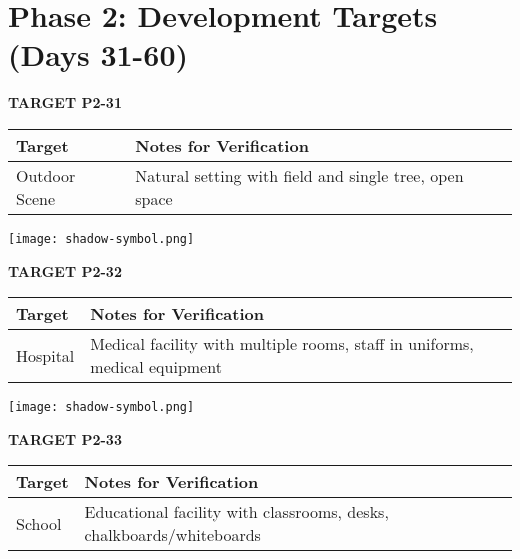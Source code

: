 \documentclass[10pt,twoside,final]{book} %
\makeatletter
\newcommand{\cleardoublepageWithSymbol}{%
  \clearpage %
  \if@twoside %
    \ifodd\c@page %
    \else %
      \thispagestyle{fancy} %
      \begingroup %
        \vspace*{0pt} %
        \vfill %
        \centering %
        \noindent 
        \texttt{[image: shadow-symbol.png]}
        \vfill %
      \endgroup
      \newpage    %
      \if@twocolumn\if@firstcolumn\else\hbox{}\newpage\fi\fi
    \fi
  \fi
}
\makeatother
\begin{document}
\section*{Phase 2: Development Targets (Days 31-60)}

\label{target:P2-31}
\begin{center}
\Large\textbf{TARGET P2-31}
\end{center}
\begin{mdframed}[backgroundcolor=white, linewidth=0.7pt, linecolor=rvprimary, shadow=true, shadowsize=1pt, shadowcolor=graydark!40, roundcorner=3pt]
\begin{tabular}{|p{3.5cm}|p{9cm}|}
\hline
\rowcolor{rvprimary!15}
\textbf{Target} & \textbf{Notes for Verification} \\
\hline
Outdoor Scene & Natural setting with field and single tree, open space \\
\hline
\end{tabular}
\end{mdframed}


\cleardoublepageWithSymbol
\label{target:P2-32}
\begin{center}
\Large\textbf{TARGET P2-32}
\end{center}
\begin{mdframed}[backgroundcolor=white, linewidth=0.7pt, linecolor=rvprimary, shadow=true, shadowsize=1pt, shadowcolor=graydark!40, roundcorner=3pt]
\begin{tabular}{|p{3.5cm}|p{9cm}|}
\hline
\rowcolor{rvprimary!15}
\textbf{Target} & \textbf{Notes for Verification} \\
\hline
Hospital & Medical facility with multiple rooms, staff in uniforms, medical equipment \\
\hline
\end{tabular}
\end{mdframed}


\cleardoublepageWithSymbol
\label{target:P2-33}
\begin{center}
\Large\textbf{TARGET P2-33}
\end{center}
\begin{mdframed}[backgroundcolor=white, linewidth=0.7pt, linecolor=rvprimary, shadow=true, shadowsize=1pt, shadowcolor=graydark!40, roundcorner=3pt]
\begin{tabular}{|p{3.5cm}|p{9cm}|}
\hline
\rowcolor{rvprimary!15}
\textbf{Target} & \textbf{Notes for Verification} \\
\hline
School & Educational facility with classrooms, desks, chalkboards/whiteboards \\
\hline
\end{tabular}
\end{mdframed}
\end{document}
